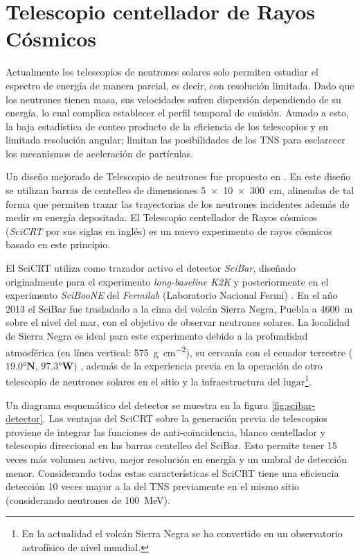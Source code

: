 
\chapter{Telescopio centellador de Rayos Cósmicos}
\label{chap:dos}

Actualmente los telescopios de neutrones solares solo permiten estudiar el espectro de energía de manera parcial, es decir, con resolución limitada. Dado que los neutrones tienen masa, sus velocidades sufren dispersión dependiendo de su energía, lo cual complica establecer el perfil temporal de emisión. Aunado a esto, la baja estadística de conteo producto de la eficiencia de los telescopios y su limitada resolución angular; limitan las posibilidades de los TNS para esclarecer los mecanismos de aceleración de partículas.

Un diseño mejorado de Telescopio de neutrones fue propuesto en \cite{sako03}. En este diseño se utilizan barras de centelleo de dimensiones \SI[product-units=power]{5x10x300}{\cm}, alineadas de tal forma que permiten trazar las trayectorias de los neutrones incidentes además de medir su energía depositada. El Telescopio centellador de Rayos cósmicos (\emph{SciCRT} por sus siglas en inglés) es un nuevo experimento de rayos cósmicos basado en este principio.

El SciCRT utiliza como trazador activo el detector \emph{SciBar}, diseñado originalmente para el experimento \emph{long-baseline K2K} \cite{knitta04} y posteriormente en el experimento \emph{SciBooNE} del \emph{Fermilab} (Laboratorio Nacional Fermi) \cite{hiraide06}. En el año \num{2013} el SciBar fue trasladado a la cima del volcán Sierra Negra, Puebla a \SI{4600}{\metre} sobre el nivel del mar, con el objetivo de observar neutrones solares. La localidad de Sierra Negra es ideal para este experimento debido a la profundidad atmosférica (en línea vertical: \SI{575}{\gram\per\square\centi\metre}), su cercanía con el ecuador terrestre ($\ang{19.0}\mathbf{N}$, $\ang{97.3}\mathbf{W}$) , además de la experiencia previa en la operación de otro telescopio de neutrones solares en el sitio y la infraestructura del lugar\footnote{En la actualidad el volcán Sierra Negra se ha convertido en un observatorio astrofísico de nivel mundial.}.

Un diagrama esquemático del detector se muestra en la figura \ref{fig:scibar-detector}. Las ventajas del SciCRT sobre la generación previa de telescopios proviene de integrar las funciones de anti-coincidencia, blanco centellador y telescopio direccional en las barras centelleo del SciBar. Esto permite tener \num{15} veces más volumen activo, mejor resolución en energía y un umbral de detección menor. Considerando todas estas características el SciCRT tiene una eficiencia detección \num{10} veces mayor a la del TNS previamente en el mismo sitio \cite{ynagai14} (considerando neutrones de \SI{100}{\mega\electronvolt}).


